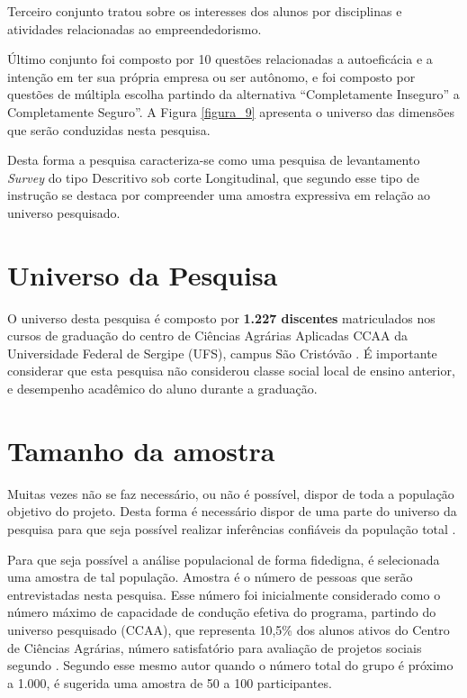 Terceiro conjunto tratou sobre os interesses dos alunos por disciplinas e atividades relacionadas ao empreendedorismo.

Último conjunto foi composto por 10 questões relacionadas a autoeficácia e a intenção em ter sua própria empresa ou ser autônomo, e foi composto por questões de múltipla escolha partindo da alternativa “Completamente Inseguro” a Completamente Seguro”. A Figura \ref{figura_9} apresenta o universo das dimensões que serão conduzidas nesta pesquisa.

Desta forma a pesquisa caracteriza-se como uma pesquisa de levantamento  \textit{Survey} do tipo Descritivo sob corte Longitudinal, que segundo  esse tipo de instrução se destaca por compreender uma amostra expressiva em relação ao universo pesquisado.

\section{Universo da Pesquisa}

O universo desta pesquisa é composto por \textbf{1.227 discentes} matriculados nos cursos de graduação do centro de Ciências Agrárias Aplicadas CCAA da Universidade Federal de Sergipe (UFS), campus São Cristóvão \cite{andrade_ufs_2019}. É importante considerar que esta pesquisa não considerou classe social local de ensino anterior, e desempenho acadêmico do aluno durante a graduação.


\section{Tamanho da amostra}

Muitas  vezes  não  se  faz necessário,  ou não é possível, dispor de toda a população objetivo do projeto. Desta forma é necessário dispor de uma parte do universo da pesquisa para que seja possível realizar inferências confiáveis da população total \cite{marino_manual_2003}.

Para que seja possível a análise populacional de forma fidedigna, é selecionada uma amostra de tal população. Amostra é o número de pessoas que serão entrevistadas nesta pesquisa. Esse número foi inicialmente considerado como o número máximo de capacidade de condução efetiva do programa, partindo do universo pesquisado (CCAA), que  representa 10,5\% dos alunos ativos do Centro de Ciências Agrárias, número satisfatório para avaliação de projetos sociais segundo . Segundo esse mesmo autor quando o número total do grupo é próximo a 1.000, é sugerida uma amostra de 50 a 100 participantes.

